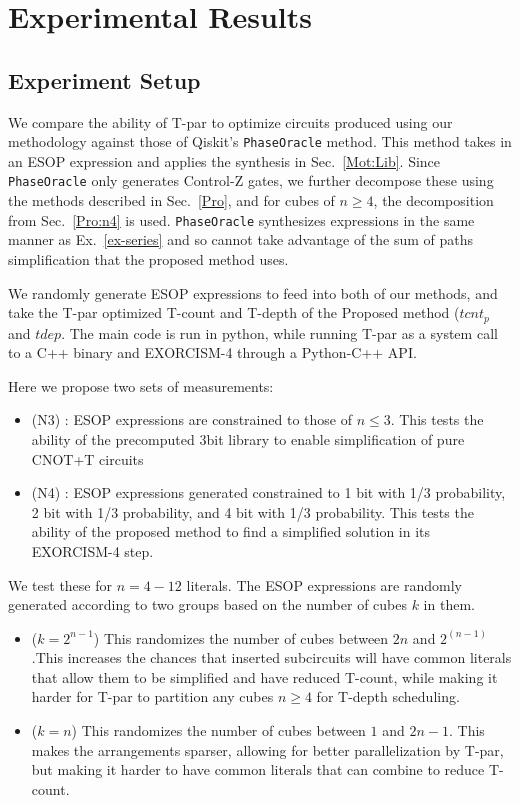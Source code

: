 \section{Experimental Results}
\label{Exp}
\subsection{Experiment Setup}
\label{Exp:Set}
We compare the ability of T-par to optimize circuits produced using our methodology against those of
Qiskit's \texttt{PhaseOracle} method. This method takes in an ESOP expression and applies the synthesis in
Sec.~\ref{Mot:Lib}. Since \texttt{PhaseOracle} only generates Control-Z gates,
we further decompose these using the methods described in Sec.~\ref{Pro}, and for cubes of $n \geq 4$,
the decomposition from Sec.~\ref{Pro:n4} is used. \texttt{PhaseOracle} synthesizes expressions in the same
manner as Ex.~\ref{ex-series} and so cannot take advantage of the sum of paths simplification that
the proposed method uses.

We randomly generate ESOP expressions to feed into both of our methods, and take the T-par optimized T-count
and T-depth of the Proposed method ($tcnt_p$ and $tdep$. The main code is run in python, while running
T-par as a system call to a C++ binary and EXORCISM-4 through a Python-C++ API.

Here we propose two sets of measurements:

\begin{itemize}
\item (N3) : ESOP expressions are constrained to those of $n \leq 3$. This tests the ability of the
  precomputed 3bit library to enable simplification of pure CNOT+T circuits
\item (N4) : ESOP expressions generated constrained to 1 bit with 1/3 probability, 2 bit with 1/3
  probability, and 4 bit with 1/3 probability. This tests the ability of the
  proposed method to find a simplified solution in its EXORCISM-4 step.
\end{itemize}

We test these for $n=4-12$ literals. The ESOP expressions are randomly generated according to two groups
based on the number of cubes $k$ in them.

\begin{itemize}
\item ($k=2^{n-1}$) This randomizes the number of cubes between $2n$ and $2^(n-1)$.This increases the chances
  that inserted subcircuits will have common literals that allow them to be simplified and have reduced T-count,
  while making it harder for T-par to partition any cubes $n \geq 4$ for T-depth scheduling.
\item ($k=n$) This randomizes the number of cubes between $1$ and $2n-1$. This makes the arrangements sparser,
  allowing for better parallelization by T-par, but making it harder to have common literals that can combine to reduce T-count.
\end{itemize}

